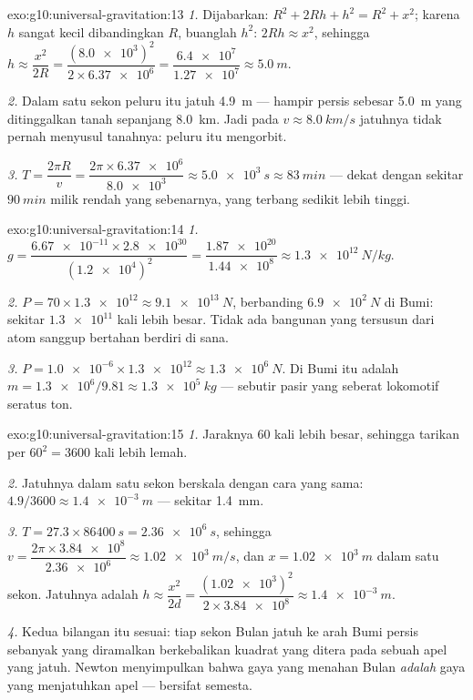 \begin{solution}{exo:g10:universal-gravitation:13}
\emph{1.} Dijabarkan: $R^2 + 2Rh + h^2 = R^2 + x^2$; karena $h$ sangat
kecil dibandingkan $R$, buanglah $h^2$: $2Rh \approx x^2$, sehingga
$h \approx \dfrac{x^2}{2R}
= \dfrac{(\num{8.0e3})^2}{2 \times \num{6.37e6}}
= \dfrac{\num{6.4e7}}{\num{1.27e7}} \approx \qty{5.0}{m}$.

\emph{2.} Dalam satu sekon peluru itu jatuh \qty{4.9}{m} --- hampir
persis sebesar \qty{5.0}{m} yang ditinggalkan tanah sepanjang
\qty{8.0}{km}. Jadi pada $v \approx \qty{8.0}{km/s}$ jatuhnya tidak
pernah menyusul tanahnya: peluru itu mengorbit.

\emph{3.} $T = \dfrac{2\pi R}{v}
= \dfrac{2\pi \times \num{6.37e6}}{\num{8.0e3}}
\approx \qty{5.0e3}{s} \approx \qty{83}{min}$ --- dekat dengan sekitar
$\qty{90}{min}$ milik   rendah yang sebenarnya, yang
terbang sedikit lebih tinggi.
\end{solution}

\begin{solution}{exo:g10:universal-gravitation:14}
\emph{1.} $g = \dfrac{\num{6.67e-11} \times \num{2.8e30}}
{(\num{1.2e4})^2} = \dfrac{\num{1.87e20}}{\num{1.44e8}}
\approx \qty{1.3e12}{N/kg}.$

\emph{2.} $P = 70 \times \num{1.3e12} \approx \qty{9.1e13}{N}$,
berbanding $\qty{6.9e2}{N}$ di Bumi: sekitar $\num{1.3e11}$ kali lebih
besar. Tidak ada bangunan yang tersusun dari atom sanggup bertahan
berdiri di sana.

\emph{3.} $P = \num{1.0e-6} \times \num{1.3e12} \approx
\qty{1.3e6}{N}$. Di Bumi itu adalah 
$m = \num{1.3e6}/9.81 \approx \qty{1.3e5}{kg}$ --- sebutir pasir yang
seberat lokomotif seratus ton.
\end{solution}

\begin{solution}{exo:g10:universal-gravitation:15}
\emph{1.} Jaraknya $60$ kali lebih besar, sehingga tarikan per
 $60^2 = 3600$ kali lebih lemah.

\emph{2.} Jatuhnya dalam satu sekon berskala dengan cara yang sama:
$4.9/3600 \approx \qty{1.4e-3}{m}$ --- sekitar \qty{1.4}{mm}.

\emph{3.} $T = 27.3 \times \qty{86400}{s} = \qty{2.36e6}{s}$, sehingga
$v = \dfrac{2\pi \times \num{3.84e8}}{\num{2.36e6}} \approx
\qty{1.02e3}{m/s}$, dan $x = \qty{1.02e3}{m}$ dalam satu sekon.
Jatuhnya adalah $h \approx \dfrac{x^2}{2d}
= \dfrac{(\num{1.02e3})^2}{2 \times \num{3.84e8}}
\approx \qty{1.4e-3}{m}$.

\emph{4.} Kedua bilangan itu sesuai: tiap sekon Bulan jatuh ke arah
Bumi persis sebanyak yang diramalkan  berkebalikan kuadrat
yang ditera pada sebuah apel yang jatuh. Newton menyimpulkan bahwa gaya
yang menahan Bulan \emph{adalah} gaya yang menjatuhkan apel ---
 bersifat semesta.
\end{solution}

